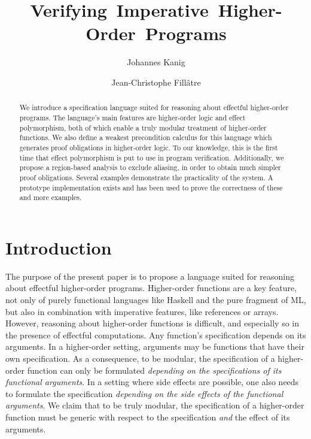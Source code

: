 \documentclass[a4paper]{llncs}
\begin{document}
\title{\mbox{Verifying Imperative Higher-Order Programs}}

\author{Johannes Kanig \and Jean-Christophe
Fill\^atre}
\maketitle

\begin{abstract} We introduce a specification language suited for reasoning
  about effectful higher-order programs. The language's main features are
  higher-order logic and effect polymorphism, both of which enable a truly
  modular treatment of higher-order functions.  We also define a weakest
  precondition calculus for this language which generates proof obligations in
  higher-order logic.  To our knowledge, this is the first time that effect
  polymorphism is put to use in program verification. Additionally, we propose
  a region-based analysis to exclude aliasing, in order to obtain much simpler
  proof obligations. Several examples demonstrate the practicality of the
  system. A prototype implementation exists and has been used to prove the
  correctness of these and more examples.  
\end{abstract}

\section{Introduction}

The purpose of the present paper is to propose a language suited for reasoning
about effectful higher-order programs.  Higher-order functions are a key
feature, not only of purely functional languages like Haskell and the pure
fragment of ML, but also in combination with imperative features, like
references or arrays. However, reasoning about higher-order functions is
difficult, and especially so in the presence of effectful computations. Any
function's specification depends on its arguments. In a higher-order setting,
arguments may be functions that have their own specification. As a consequence,
to be modular, the specification of a higher-order function can only be
formulated {\em depending on the specifications of its functional arguments}.
In a setting where side effects are possible, one also needs to formulate the
specification {\em depending on the side effects of the functional arguments}.
We claim that to be truly modular, the specification of a higher-order
function must be generic with respect to the specification {\em and} the
effect of its arguments.
\end{document}
